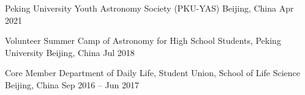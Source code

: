 


\begin{cventries}

{Peking University Youth Astronomy Society (PKU-YAS)}
{Beijing, China}
{Apr 2021}
{}


\cventry
{Volunteer} %
{Summer Camp of Astronomy for High School Students, Peking University} %
{Beijing, China} %
{Jul 2018} %
{ %
}




\cventry
{Core Member} %
{Department of Daily Life, Student Union, School of Life Science} %
{Beijing, China} %
{Sep 2016 -- Jun 2017} %
{ %
}

\end{cventries}